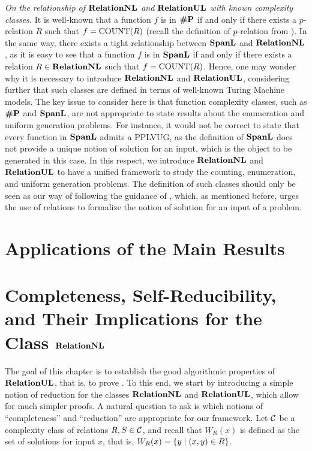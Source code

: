 \documentclass[11pt,twoside=off,numbers=noenddot]{scrbook}
\begin{document}
\textit{On the relationship of $\textbf{RelationNL}$ and $\textbf{RelationUL}$ with known complexity classes.} It is well-known that a function $f$ is in $\textbf{\#P}$ if and only if there exists a $p$-relation $R$ such that $f = \text{COUNT}(R)$ (recall the definition of $p$-relation from ). In the same way, there exists a tight relationship between $\textbf{SpanL}$ and $\textbf{RelationNL}$, as it is easy to see that a function $f$ is in $\textbf{SpanL}$ if and only if there exists a relation $R \in \textbf{RelationNL}$ such that $f = \text{COUNT}(R)$. Hence, one may wonder why it is necessary to introduce $\textbf{RelationNL}$ and $\textbf{RelationUL}$, considering further that such classes are defined in terms of well-known Turing Machine models. The key issue to consider here is that function complexity classes, such as $\textbf{\#P}$ and $\textbf{SpanL}$, are not appropriate to state results about the enumeration and uniform generation problems. For instance, it would not be correct to state that every function in $\textbf{SpanL}$ admits a PPLVUG, as the definition of $\textbf{SpanL}$ does not provide a unique notion of solution for an input, which is the object to be generated in this case. In this respect, we introduce $\textbf{RelationNL}$ and $\textbf{RelationUL}$ to have a unified framework to study the counting, enumeration, and uniform generation problems. The definition of such classes should only be seen as our way of following the guidance of \cite{jerrum1986random}, which, as mentioned before, urges the use of relations to formalize the notion of solution for an input of a problem.

\chapter{Applications of the Main Results}


\chapter{Completeness, Self-Reducibility, and Their Implications for the Class $\textbf{RelationNL}$}
The goal of this chapter is to establish the good algorithmic properties of $\textbf{RelationUL}$, that is, to prove . To this end, we start by introducing a simple notion of reduction for the classes $\textbf{RelationNL}$ and $\textbf{RelationUL}$, which allow for much simpler proofs. A natural question to ask is which notions of ``completeness'' and ``reduction'' are appropriate for our framework. Let $\mathcal{C}$ be a complexity class of relations $R, S \in \mathcal{C}$, and recall that $W_R(x)$ is defined as the set of solutions for input $x$, that is, $W_R(x) = \{ y \mid (x, y) \in R \}$.
\end{document}
